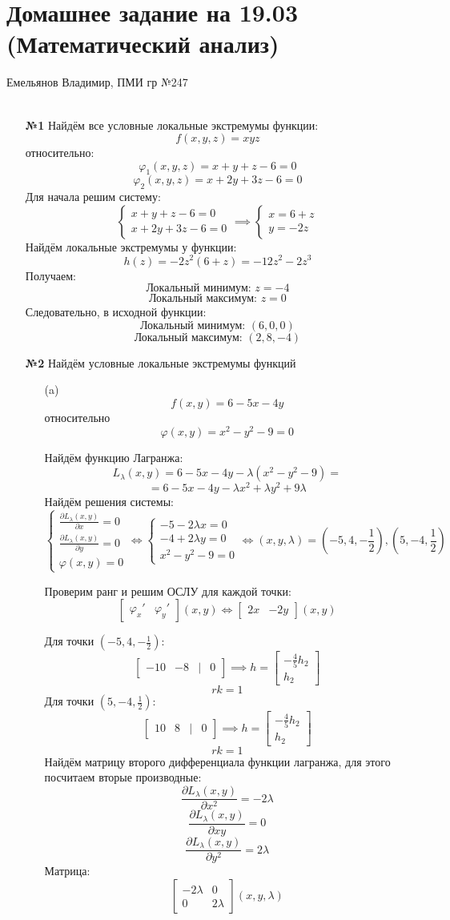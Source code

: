 \documentclass[a4paper]{article}
\newcommand{\matsq}[1]{\begin{bmatrix} #1 \end{bmatrix}}
\renewcommand{\f}[2]{\frac{#1}{#2}}
\newcommand{\case}[1]{\begin{cases} #1 \end{cases}}
\renewcommand{\phi}{\varphi}
\newcommand{\lr}{\Leftrightarrow}
\newcommand{\p}{\partial}
\begin{document}
\section*{Домашнее задание на 19.03 (Математический анализ)}
 {\large Емельянов Владимир, ПМИ гр №247}\\\\
\begin{enumerate}
    \item[\textbf{№1}]Найдём все условные локальные экстремумы функции:
    $$f(x, y, z) = xyz$$
    относительно:
    $$\phi_1(x, y, z) = x+y+z-6 = 0$$
    $$\phi_2(x, y, z) = x+2y+3z-6=0$$
    Для начала решим систему:
    $$\case{
        x+y+z-6 = 0\\
        x+2y+3z-6=0
    }\implies \case{x = 6+z\\y=-2z}$$
    Найдём локальные экстремумы у функции:
    $$h(z) = -2z^2(6+z) = -12z^2 - 2z^3$$
    Получаем:
    $$\text{Локальный минимум: } z = -4$$
    $$\text{Локальный максимум: } z = 0$$
    Следовательно, в исходной функции:
    $$\text{Локальный минимум: } (6, 0, 0)$$
    $$\text{Локальный максимум: } (2, 8, -4)$$

    \item[\textbf{№2}]Найдём условные локальные экстремумы функций
    \begin{enumerate}
        \item[(a)]$$f(x, y) = 6-5x - 4y$$
        относительно
        $$\phi(x, y) = x^2-y^2-9=0$$

        Найдём функцию Лагранжа:
        $$L_\lambda(x, y) = 6-5x - 4y-\lambda(x^2-y^2-9) =$$
        $$= 6-5x-4y-\lambda x^2+\lambda y^2+9\lambda$$
        Найдём решения системы:
        $$\case{
            \f{\p L_\lambda(x, y)}{\p x} = 0\\
            \f{\p L_\lambda(x, y)}{\p y} = 0\\
            \phi(x, y)=0
        } \lr \case{
            -5-2\lambda x = 0\\
            -4+2\lambda y= 0\\
            x^2-y^2-9=0
        }\lr (x, y, \lambda) = (-5, 4, -\f{1}{2}), (5, -4, \f{1}{2})$$

        Проверим ранг и решим ОСЛУ для каждой точки:
        $$\matsq{\phi_x' & \phi_y'}(x, y) \lr \matsq{2x & -2y}(x, y)$$

        Для точки $(-5, 4, -\f{1}{2})$:
        $$\matsq{-10 & -8 & | & 0} \implies h = \matsq{-\f{4}{5}h_2 \\ h_2}$$
        $$rk = 1$$
        Для точки $(5, -4, \f{1}{2})$:
        $$\matsq{10 & 8 & | & 0} \implies h = \matsq{-\f{4}{5}h_2 \\ h_2}$$
        $$rk = 1$$
        Найдём матрицу второго дифференциала функции лагранжа, для этого посчитаем вторые производные:
        $$\f{\p L_\lambda(x, y)}{\p x^2} = -2\lambda$$
        $$\f{\p L_\lambda(x, y)}{\p xy} = 0$$
        $$\f{\p L_\lambda(x, y)}{\p y^2} = 2\lambda$$
        Матрица:
        $$\matsq{-2\lambda & 0 \\ 0 & 2\lambda}(x, y, \lambda)$$


\end{enumerate}
\end{enumerate}
\end{document}
